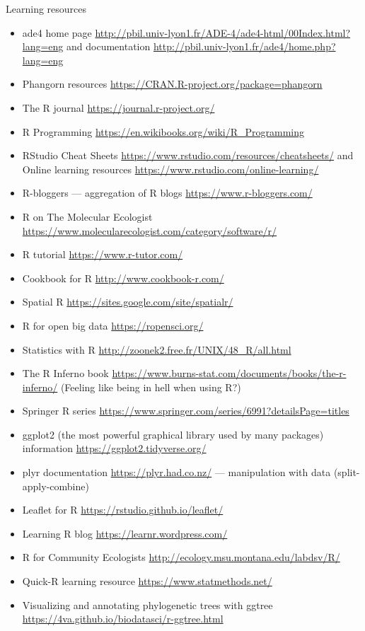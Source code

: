 \documentclass[compress, ucs, xelatex, 11pt, xcolor=svgnames,
	hyperref={
		bookmarks=true,
		unicode=true,
		colorlinks=true,
		pdftitle={Molecular data in R},
		plainpages=false,
		pdfauthor={Vojtech Zeisek},
		pdfsubject={Course about phylogeny and evolution in R},
		pdfcreator={XeLaTeX},
		pdfkeywords={R, evolution, phylogeny, molecular data},
		linkcolor=Tomato,
		anchorcolor=SaddleBrown,
		citecolor=Goldenrod,
		filecolor=DarkMagenta,
		menucolor=Sienna,
		urlcolor=DarkTurquoise,
		pdftex},
	url={hyphens, lowtilde} %
	]{beamer}
\begin{document}
\begin{frame}[allowframebreaks]{Learning resources}
\begin{itemize}
		\item ade4 home page \url{http://pbil.univ-lyon1.fr/ADE-4/ade4-html/00Index.html?lang=eng} and documentation \url{http://pbil.univ-lyon1.fr/ade4/home.php?lang=eng}
		\item Phangorn resources \url{https://CRAN.R-project.org/package=phangorn}
		\item The R journal \url{https://journal.r-project.org/}
		\item R Programming \url{https://en.wikibooks.org/wiki/R_Programming}
		\item RStudio Cheat Sheets \url{https://www.rstudio.com/resources/cheatsheets/} and Online learning resources \url{https://www.rstudio.com/online-learning/}
		\item R-bloggers --- aggregation of R blogs \url{https://www.r-bloggers.com/}
		\item R on The Molecular Ecologist \url{https://www.molecularecologist.com/category/software/r/}
		\item R tutorial \url{https://www.r-tutor.com/}
		\item Cookbook for R  \url{http://www.cookbook-r.com/}
		\item Spatial R \url{https://sites.google.com/site/spatialr/}
		\item R for open big data \url{https://ropensci.org/}
		\item Statistics with R \url{http://zoonek2.free.fr/UNIX/48_R/all.html}
		\item The R Inferno book \url{https://www.burns-stat.com/documents/books/the-r-inferno/} (Feeling like being in hell when using R?)
		\item Springer R series \url{https://www.springer.com/series/6991?detailsPage=titles}
		\item ggplot2 (the most powerful graphical library used by many packages) information \url{https://ggplot2.tidyverse.org/}
		\item plyr documentation \url{https://plyr.had.co.nz/} --- manipulation with data (split-apply-combine)
		\item Leaflet for R \url{https://rstudio.github.io/leaflet/}
		\item Learning R blog \url{https://learnr.wordpress.com/}
		\item R for Community Ecologists \url{http://ecology.msu.montana.edu/labdsv/R/}
		\item Quick-R learning resource \url{https://www.statmethods.net/}
		\item Visualizing and annotating phylogenetic trees with ggtree \url{https://4va.github.io/biodatasci/r-ggtree.html}

\end{itemize}
\end{frame}
\end{document}
